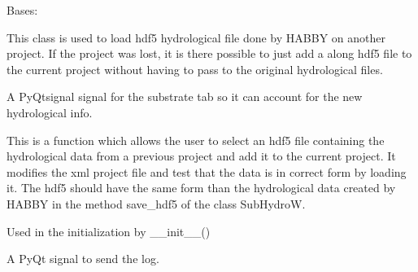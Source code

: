 \documentclass[letterpaper,10pt,english]{sphinxmanual}
\begin{document}
\begin{fulllineitems}
\label{\detokenize{index:src_GUI.hydro_GUI_2.HabbyHdf5}}
Bases: 

This class is used to load hdf5 hydrological file done by HABBY on another project. If the project was lost,
it is there possible to just add a along hdf5 file to the current project without having to pass to the original
hydrological files.

\begin{fulllineitems}
\label{\detokenize{index:src_GUI.hydro_GUI_2.HabbyHdf5.drop_hydro}}
A PyQtsignal signal for the substrate tab so it can account for the new hydrological info.

\end{fulllineitems}


\begin{fulllineitems}
\label{\detokenize{index:src_GUI.hydro_GUI_2.HabbyHdf5.get_new_hydro_hdf5}}
This is a function which allows the user to select an hdf5 file containing the hydrological
data from a previous project and add it to the current project. It modifies the xml project file and test
that the data is in correct form by loading it. The hdf5 should have the same form than the hydrological data
created by HABBY in the method save\_hdf5 of the class SubHydroW.

\end{fulllineitems}


\begin{fulllineitems}
\label{\detokenize{index:src_GUI.hydro_GUI_2.HabbyHdf5.init_iu}}
Used in the initialization by \_\_init\_\_()

\end{fulllineitems}


\begin{fulllineitems}
\label{\detokenize{index:src_GUI.hydro_GUI_2.HabbyHdf5.send_log}}
A PyQt signal to send the log.

\end{fulllineitems}


\end{fulllineitems}
\end{document}
